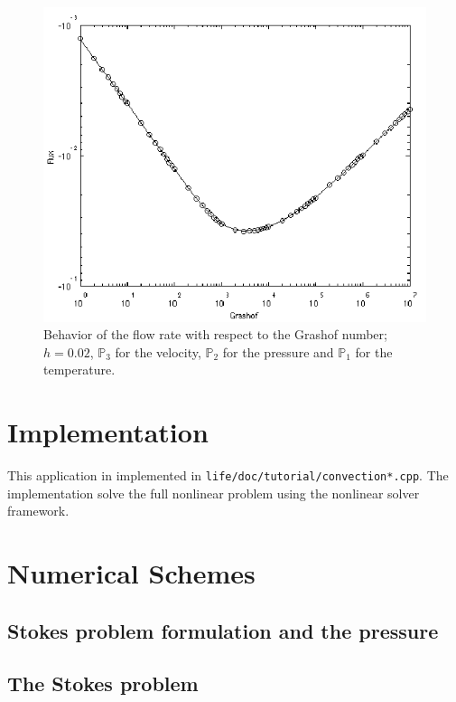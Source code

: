\begin{figure}[htbp]
  \centering
  \includegraphics[width=.8\linewidth]{pngs/debit_grashof}
  \caption{Behavior of the flow rate with respect to the Grashof number; $h = 0.02$,
    $\mathbb{P}_3$ for the velocity, $\mathbb{P}_2$ for the pressure and
    $\mathbb{P}_1$ for the temperature.}
  \label{fig:4}
\end{figure}

\section{Implementation}
\label{sec:implementation}

This application in implemented in
\texttt{life/doc/tutorial/convection*.cpp}. The implementation solve
the full nonlinear problem using the nonlinear solver framework.

\section{Numerical Schemes}
\label{sec:numerical-schemes}

\subsection{Stokes problem formulation and the pressure}
\label{sec:stok-probl-form}

\subsection{The Stokes problem}
\label{sec:stokes-problem}

